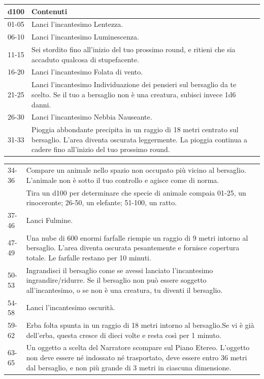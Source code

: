 \begin{multicols}{2}
\noindent\begin{tabularx}{0.50\textwidth}{lX}
	\toprule
\textbf{d100}& \textbf{Contenuti}\\
\toprule
01-05 &Lanci l'incantesimo Lentezza.\\
06-10 &Lanci l'incantesimo Luminescenza.\\
11-15 &Sei stordito fino all'inizio del tuo prossimo round, e ritieni che sia accaduto qualcosa di stupefacente.\\
16-20 &Lanci l'incantesimo Folata di vento.\\
21-25 &Lanci l'incantesimo Individuazione dei pensieri sul bersaglio da te scelto. Se il tuo a bersaglio non è una creatura, subisci invece 1d6 danni.\\
26-30 &Lanci l'incantesimo Nebbia Nauseante.\\
31-33 &Pioggia abbondante precipita in un raggio di 18 metri centrato sul bersaglio. L'area diventa oscurata leggermente. La pioggia continua a cadere fino all'inizio del tuo prossimo round.\\
\end{tabularx}
\noindent\begin{tabularx}{0.50\textwidth}{lX}
34-36 &Compare un animale nello spazio non occupato più vicino al bersaglio. L'animale non è sotto il tuo controllo e agisce come di norma. \\
&Tira un d100 per determinare che specie di animale compaia 01-25, un rinoceronte; 26-50, un elefante; 51-100, un ratto.\\
37-46 &Lanci Fulmine.\\
47-49 &Una nube di 600 enormi farfalle riempie un raggio di 9 metri intorno al bersaglio. L'area diventa oscurata pesantemente e fornisce copertura totale. Le farfalle restano per 10 minuti.\\
50-53 &Ingrandisci il bersaglio come se avessi lanciato l'incantesimo ingrandire/ridurre. Se il bersaglio non può essere soggetto all'incantesimo, o se non è una creatura, tu diventi il bersaglio.\\
54-58 &Lanci l'incantesimo oscurità.\\
59-62 &Erba folta spunta in un raggio di 18 metri intorno al bersaglio.Se vi è già dell'erba, questa cresce di dieci volte e resta così per 1 minuto.\\
63-65 &Un oggetto a scelta del Narratore scompare sul Piano Etereo. L'oggetto non deve essere né indossato né trasportato, deve essere entro 36 metri dal bersaglio, e non più grande di 3 metri in ciascuna dimensione.\\

\end{tabularx}
\end{multicols}

